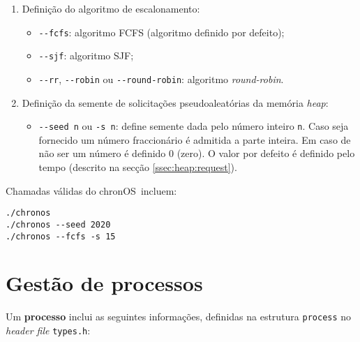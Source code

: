 \documentclass[10pt,oneside]{estiloUBI}
\newcommand{\chronOS}{\textsf{chronOS}}
\begin{document}
	\begin{enumerate}
		\item Definição do algoritmo de escalonamento:
		\begin{itemize}
			\item \verb|--fcfs|: algoritmo \ac{FCFS} (algoritmo definido por defeito);
			\item \verb|--sjf|: algoritmo \ac{SJF};
			\item \verb|--rr|, \verb|--robin| ou \verb|--round-robin|: algoritmo \textit{round-robin}. 
		\end{itemize}
	
		\item Definição da semente de solicitações pseudoaleatórias da memória \textit{heap}:
		\begin{itemize}
			\item \verb|--seed n| ou \verb|-s n|: define semente dada pelo número inteiro \verb|n|. Caso seja fornecido um número fraccionário é admitida a parte inteira. Em caso de não ser um número é definido 0 (zero). O valor por defeito é definido pelo tempo (descrito na secção \ref{ssec:heap:request}).
		\end{itemize}
	\end{enumerate}
	
	Chamadas válidas do \chronOS~incluem:
	
	\begin{verbatim}
./chronos
./chronos --seed 2020
./chronos --fcfs -s 15
	\end{verbatim}
	
	
	
	\chapter{Gestão de processos}
	\label{sec:process}
	
	Um \textbf{processo} inclui as seguintes informações, definidas na estrutura \verb|process| no \textit{header file} \texttt{types.h}:
	
\end{document}
